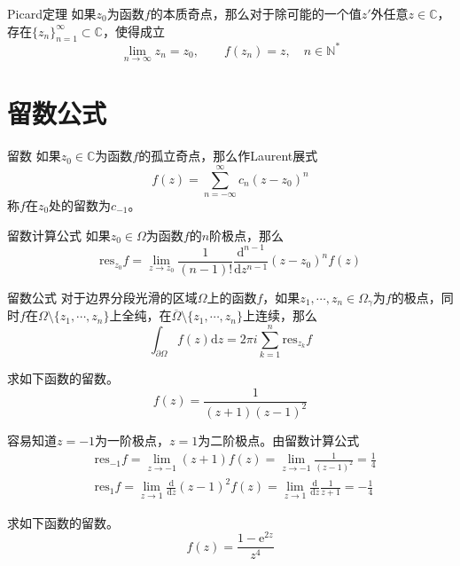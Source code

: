 \documentclass[lang = cn, scheme = chinese, thmcnt = section]{elegantbook}
\newcommand{\N}{\mathbb{N}}            %
\newcommand{\C}{\mathbb{C}}  		   %
\newcommand{\sub}{\subset}             %
\begin{document}
\begin{theorem}{Picard定理}
	如果$z_0$为函数$f$的本质奇点，那么对于除可能的一个值$z'$外任意$z\in\C$，存在$\{z_n\}_{n=1}^{\infty}\sub\C$，使得成立
	$$
	\lim_{n\to\infty}z_n=z_0,\qquad 
	f(z_n)=z,\quad n\in\N^*
	$$
\end{theorem}

\section{留数公式}

\begin{definition}{留数}
	如果$z_0\in\C$为函数$f$的孤立奇点，那么作Laurent展式
	$$
	f(z)=\sum_{n=-\infty}^{\infty}{c_n(z-z_0)^n}
	$$
	称$f$在$z_0$处的留数为$c_{-1}$。
\end{definition}

\begin{theorem}{留数计算公式}
	如果$z_0\in\Omega$为函数$f$的$n$阶极点，那么
	$$
	\mathrm{res}_{z_0}f=
	\lim_{z\to z_0}{\frac{1}{(n-1)!}\frac{\mathrm{d}^{n-1}}{\mathrm{d}z^{n-1}} (z-z_0)^n f(z)}
	$$
\end{theorem}

\begin{theorem}{留数公式}
	对于边界分段光滑的区域$\Omega$上的函数$f$，如果$z_1,\cdots,z_n\in\Omega_\gamma$为$f$的极点，同时$f$在$\Omega\setminus\{z_1,\cdots,z_n\}$上全纯，在$\overline{\Omega}\setminus\{z_1,\cdots,z_n\}$上连续，那么
	$$
	\int_{\partial\Omega}{f(z)\mathrm{d}z}=2\pi i \sum_{k=1}^{n}{\mathrm{res}_{z_k}f}
	$$
\end{theorem}

\begin{example}
	求如下函数的留数。
	$$
	f(z)=\frac{1}{(z+1)(z-1)^2}
	$$
\end{example}

\begin{solution}
	容易知道$z=-1$为一阶极点，$z=1$为二阶极点。由留数计算公式
	\begin{align*}
		& \mathrm{res}_{-1}f=\lim_{z\to -1}(z+1)f(z)=\lim_{z\to -1}\frac{1}{(z-1)^2}=\frac{1}{4}\\
		& \mathrm{res}_{1}f=\lim_{z\to 1}\frac{\mathrm{d}}{\mathrm{d}z}(z-1)^2f(z)=\lim_{z\to 1}\frac{\mathrm{d}}{\mathrm{d}z}\frac{1}{z+1}=-\frac{1}{4}
	\end{align*}
\end{solution}

\begin{example}
	求如下函数的留数。
	$$
	f(z)=\frac{1-\mathrm{e}^{2z}}{z^4}
	$$
\end{example}
\end{document}
